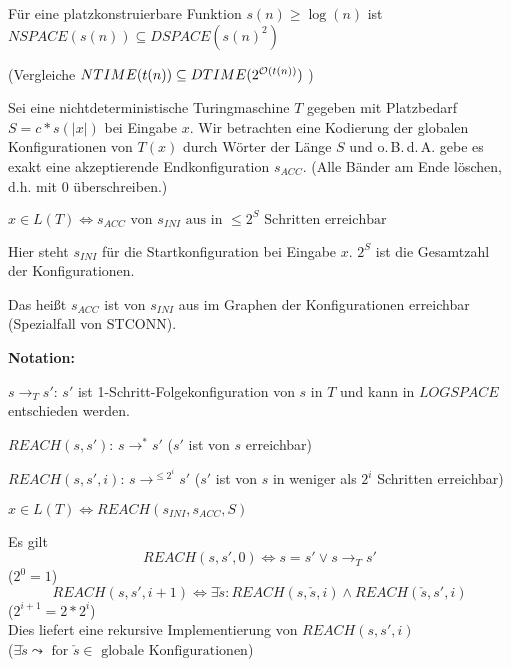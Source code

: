 \begin{satz}


    Für eine platzkonstruierbare Funktion $s(n) \geq \log(n)$ ist \\
    $ NSPACE(s(n)) \subseteq DSPACE(s(n)^2)$

    (Vergleiche
    $ NTIME(t(n)) \subseteq DTIME(2^{\mathcal{O}(t(n))})$
    )

\end{satz}

\begin{beweis}

    Sei eine nichtdeterministische Turingmaschine $T$ gegeben mit Platzbedarf $S = c * s(|x|)$ bei Eingabe $x$. Wir betrachten eine Kodierung der globalen Konfigurationen von $T(x)$ durch Wörter der Länge $S$ und o.\,B.\,d.\,A. gebe es exakt eine akzeptierende Endkonfiguration $s_{ACC}$. (Alle Bänder am Ende löschen, d.h. mit $0$ überschreiben.)

    $
    x \in L(T)
        \Longleftrightarrow
    s_{ACC} \text{ von } s_{INI} \text{ aus in } \leq 2^S \text{ Schritten erreichbar}
    $

    Hier steht $s_{INI}$ für die Startkonfiguration bei Eingabe $x$. $2^S$ ist die Gesamtzahl der Konfigurationen.

    Das heißt $s_{ACC}$ ist von $s_{INI}$ aus im Graphen der Konfigurationen erreichbar (Spezialfall von STCONN).

\end{beweis}


\textbf{Notation:}

$s \rightarrow_T s'$: $s'$ ist 1-Schritt-Folgekonfiguration von $s$ in $T$ und kann in $LOGSPACE$ entschieden werden.

$REACH(s, s')$: $s \rightarrow^\ast s'$ ($s'$ ist von $s$ erreichbar)

$REACH(s, s', i)$: $s \rightarrow^{\leq 2^i} s'$ ($s'$ ist von $s$ in weniger als $2^i$ Schritten erreichbar)


$ x \in L(T) \Longleftrightarrow REACH(s_{INI}, s_{ACC}, S)$

Es gilt
$$REACH(s, s', 0) \Longleftrightarrow s = s' \lor s \rightarrow_T s'$$
\hspace{4cm}($2^0 = 1$)
$$REACH(s, s', i+1) \Longleftrightarrow \exists \check{s} : REACH(s, \check{s}, i) \land REACH(\check{s}, s', i)$$
\hspace{4cm}($2^{i+1} = 2 * 2^i$)\\
Dies liefert eine rekursive Implementierung von $REACH(s,s',i)$ \\
\hspace{4cm}($\exists \check{s} \leadsto \text { for } \check{s} \in \text{ globale Konfigurationen}$)


